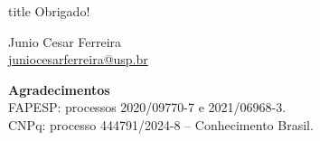 \documentclass[11pt,brazil]{beamer}
\begin{document}
\begin{frame}[plain]
  \vfill
  \begin{beamercolorbox}[sep=8pt,center,shadow=true,rounded=true]{title}
    Obrigado!\par
  \end{beamercolorbox}
  \medskip
  \begin{center}
    Junio Cesar Ferreira\\
    \href{mailto:juniocesarferreira@usp.br}{juniocesarferreira@usp.br}
  \end{center}
  \vfill
  {\footnotesize
    \textbf{Agradecimentos}\\
    FAPESP: processos 2020/09770-7 e 2021/06968-3.\\
    CNPq: processo 444791/2024-8 -- Conhecimento Brasil.
  }
\end{frame}
\end{document}
